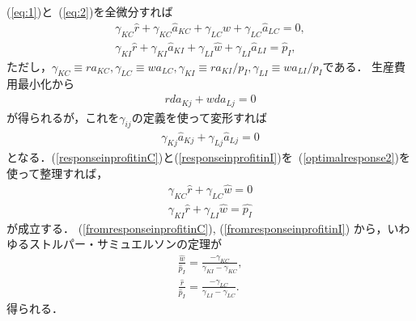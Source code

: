 \documentclass[12pt,a4paper]{jsarticle}
\begin{document}
(\ref{eq:1})と~(\ref{eq:2})を全微分すれば
\begin{align}
	\gamma_{KC} \hat{r} + \gamma_{KC} \hat{a}_{KC} + \gamma_{LC} \hat{w} + \gamma_{LC} \hat{a}_{LC} = 0, \label{responseinprofitinC}\\
	\gamma_{KI} \hat{r} + \gamma_{KI} \hat{a}_{KI} + \gamma_{LI} \hat{w} + \gamma_{LI} \hat{a}_{LI} = \hat{p}_{I}, \label{responseinprofitinI}
\end{align}
ただし，$\gamma_{KC} \equiv  r a_{KC}, \gamma_{LC} \equiv  w a_{LC}, \gamma_{KI} \equiv  r a_{KI} /p_{I}, \gamma_{LI} \equiv  w a_{LI}/p_{I}$である．
生産費用最小化から
\begin{align}
	r d a_{Kj} + w da_{Lj} =0 \label{optimalresponse}
\end{align}
が得られるが，これを$\gamma_{ij}$の定義を使って変形すれば
\begin{align}
	\gamma_{Kj} \hat{a}_{Kj} + \gamma_{Lj} \hat{a}_{Lj} =0 \label{optimalresponse2}
\end{align}
となる．(\ref{responseinprofitinC})と(\ref{responseinprofitinI})を~(\ref{optimalresponse2})を使って整理すれば，
\begin{align}
	\gamma_{KC} \hat{r} + \gamma_{LC} \hat{w} = 0 \label{fromresponseinprofitinC}\\
	\gamma_{KI} \hat{r} + \gamma_{LI} \hat{w} = \hat{p_{I}} \label{fromresponseinprofitinI}
\end{align}
が成立する．
(\ref{fromresponseinprofitinC}), (\ref{fromresponseinprofitinI})
から，いわゆるストルパー・サミュエルソンの定理が
\begin{align}
	\frac{\hat{w}}{\hat{p}_{I}} = \frac{- \gamma_{KC}}{\gamma_{KI} -\gamma_{KC}}, \label{ss1}\\
	\frac{\hat{r}}{\hat{p}_{I}} = \frac{- \gamma_{LC}}{\gamma_{LI} -\gamma_{LC}}.  \label{ss2}
\end{align}
得られる．
\end{document}
